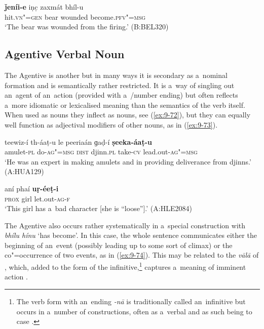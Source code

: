 \begin{exe}
\ex
\label{ex:9-71}
\gll \textbf{ǰeníi-e} iṇc̣ zaxmát bhíl-u \\
hit.\textsc{vn"=gen} bear wounded become.\textsc{pfv"=msg} \\
\glt `The bear was wounded from the firing.' (B:BEL320)
\end{exe}

\subsection{Agentive Verbal Noun}
\label{subsec:9-3-4}


The Agentive  is another  but in many ways it is secondary as a~nominal formation and is semantically rather restricted. It is a~way of singling out an~agent of an~action (provided with a~/number ending) but often reflects a~more idiomatic or lexicalised meaning than the semantics of the verb itself. When used as nouns they inflect as nouns, see (\ref{ex:9-72}), but they can equally well function as adjectival modifiers of other nouns, as in (\ref{ex:9-73}).

\begin{exe}
\ex
\label{ex:9-72}
\gll teewiz-í th-áaṭ-u le peeriaán ɡaḍ-í \textbf{ṣeeka-áaṭ-u} \\
amulet-\textsc{pl} do-\textsc{ag"=msg} \textsc{dist} djinn.\textsc{pl} take-\textsc{cv} lead.out-\textsc{ag"=msg} \\
\glt `He was an expert in making amulets and in providing deliverance from djinns.' (A:HUA129)

\ex
\label{ex:9-73}
\gll aní phaí \textbf{uṛ-éeṭ-i} \\
\textsc{prox} girl let.out-\textsc{ag-f} \\
\glt `This girl has a~bad character [she is ``loose''].' (A:HLE2084)
\end{exe}

The Agentive  also occurs rather systematically in a~special construction with \textit{bhílu hínu} `has become'. In this case, the whole sentence communicates either the beginning of an~event (possibly leading up to some sort of climax) or the co"=occurrence of two events, as in (\ref{ex:9-74}). This may be related to the \textit{vālā} of \iliUrduHindi, which, added to the  form of the infinitive,\footnote{The \iliUrdu verb form with an~ending \textit{-nā} is traditionally called an~infinitive but occurs in a~number of constructions, often as a~verbal  and as such being  to case  \citep[132--142]{schmidt1999}.} captures a~meaning of imminent action \citep[139]{schmidt1999}. 

